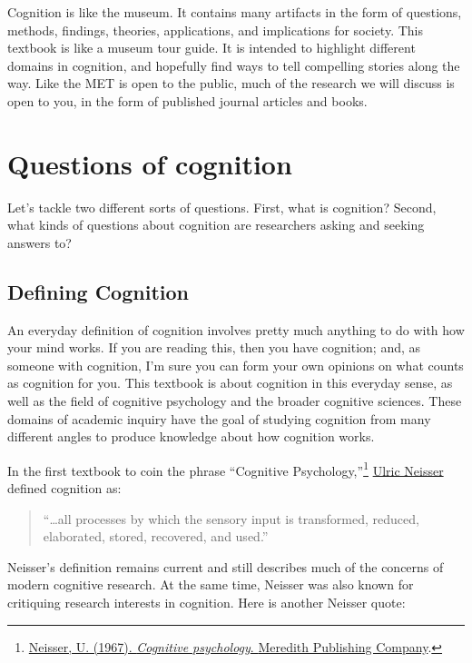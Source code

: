 \documentclass[
  oneside,
  12pt]{crumpbook}
\begin{document}
Cognition is like the museum. It contains many artifacts in the form of questions, methods, findings, theories, applications, and implications for society. This textbook is like a museum tour guide. It is intended to highlight different domains in cognition, and hopefully find ways to tell compelling stories along the way. Like the MET is open to the public, much of the research we will discuss is open to you, in the form of published journal articles and books.

\hypertarget{questions-of-cognition}{%
\section{Questions of cognition}\label{questions-of-cognition}}

Let's tackle two different sorts of questions. First, what is cognition? Second, what kinds of questions about cognition are researchers asking and seeking answers to?

\hypertarget{defining-cognition}{%
\subsection{Defining Cognition}\label{defining-cognition}}

An everyday definition of cognition involves pretty much anything to do with how your mind works. If you are reading this, then you have cognition; and, as someone with cognition, I'm sure you can form your own opinions on what counts as cognition for you. This textbook is about cognition in this everyday sense, as well as the field of cognitive psychology and the broader cognitive sciences. These domains of academic inquiry have the goal of studying cognition from many different angles to produce knowledge about how cognition works.

In the first textbook to coin the phrase ``Cognitive Psychology,''\footnote{\protect\hyperlink{ref-neisserCognitivePsychology1967}{Neisser, U. (1967). \emph{Cognitive psychology}. {Meredith Publishing Company}}.} \href{https://en.wikipedia.org/wiki/Ulric_Neisser}{Ulric Neisser} defined cognition as:

\begin{quote}
``\ldots all processes by which the sensory input is transformed, reduced, elaborated, stored, recovered, and used.''
\end{quote}

Neisser's definition remains current and still describes much of the concerns of modern cognitive research. At the same time, Neisser was also known for critiquing research interests in cognition. Here is another Neisser quote:
\end{document}
